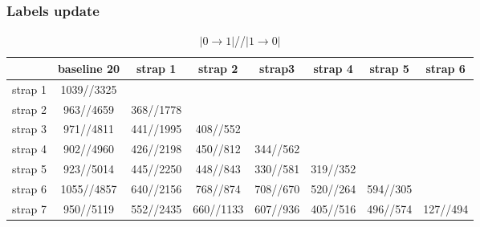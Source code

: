 \documentclass[10pt]{article}
\newcommand{\1}{\mathbbm{1}}
\newcommand{\0}{\mathbf{0}}
\begin{document}
\subsubsection*{Labels update}
\begin{table}[H]
    \centering
    \begin{tabular}{|c|c|c|c|c|c|c|c|}
    \hline
           & baseline 20     &  strap 1      & strap 2    &   strap3    & strap 4  &  strap 5 &  strap 6\\
    \hline
    strap 1&    1039//3325   &               &            &             &          &          &          \\
    strap 2&    963//4659    &  368//1778    &            &             &          &          &          \\
    strap 3&     971//4811   &  441//1995    &  408//552  &             &          &          &          \\
    strap 4&     902//4960   &  426//2198    &  450//812  & 344//562    &          &          &          \\
    strap 5&     923//5014   &  445//2250    &  448//843  & 330//581    & 319//352 &          &          \\
    strap 6&    1055//4857   &  640//2156    &  768//874  & 708//670    & 520//264 & 594//305 &          \\
    strap 7&     950//5119   &  552//2435    &  660//1133 & 607//936    & 405//516 & 496//574 & 127//494 \\

    \hline
    \end{tabular}
    \caption{$|0\rightarrow 1|$//$|1\rightarrow 0|$}
\end{table}
\vspace{-5pt}
\end{document}

